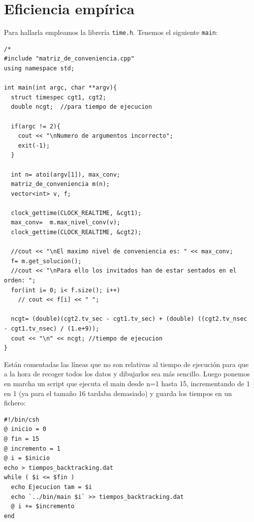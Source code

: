 \documentclass[12pt]{article}
\begin{document}
\section{Eficiencia empírica}
Para hallarla empleamos la librería \verb|time.h|. Tenemos el siguiente \verb|main|: 
\begin{lstlisting}
/*
#include "matriz_de_conveniencia.cpp"
using namespace std;

int main(int argc, char **argv){
  struct timespec cgt1, cgt2;
  double ncgt;  //para tiempo de ejecucion

  if(argc != 2){
    cout << "\nNumero de argumentos incorrecto";
    exit(-1);
  }

  int n= atoi(argv[1]), max_conv;
  matriz_de_conveniencia m(n);
  vector<int> v, f;

  clock_gettime(CLOCK_REALTIME, &cgt1);
  max_conv=  m.max_nivel_conv(v);
  clock_gettime(CLOCK_REALTIME, &cgt2);

  //cout << "\nEl maximo nivel de conveniencia es: " << max_conv;
  f= m.get_solucion();
  //cout << "\nPara ello los invitados han de estar sentados en el orden: ";
  for(int i= 0; i< f.size(); i++)
    // cout << f[i] << " ";

  ncgt= (double)(cgt2.tv_sec - cgt1.tv_sec) + (double) ((cgt2.tv_nsec - cgt1.tv_nsec) / (1.e+9));
  cout << "\n" << ncgt; //tiempo de ejecucion
}
\end{lstlisting}
Están comentadas las líneas que no son relativas al tiempo de ejecución para que a la hora de recoger todos los datos y dibujarlos sea más sencillo. Luego ponemos en marcha un script que ejecuta el main desde n=1 hasta 15, incrementando de 1 en 1 (ya para el tamaño 16 tardaba demasiado) y guarda los tiempos en un fichero:
\begin{lstlisting}
#!/bin/csh
@ inicio = 0
@ fin = 15
@ incremento = 1
@ i = $inicio
echo > tiempos_backtracking.dat
while ( $i <= $fin )
  echo Ejecucion tam = $i
  echo `../bin/main $i` >> tiempos_backtracking.dat
  @ i += $incremento
end
\end{lstlisting}
\end{document}
